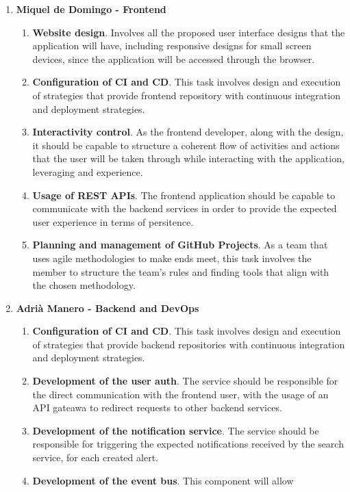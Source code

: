 \documentclass[../memory.tex]{subfiles}
\begin{document}
\begin{enumerate}[label =]
	\item\textbf{Miquel de Domingo - Frontend}
	\begin{enumerate}[label = -]
		\item\textbf{Website design}. Involves all the proposed user interface
		designs that the application will have, including responsive designs
		for small screen devices, since the application will be accessed
		through the browser.
		\item\textbf{Configuration of CI and CD}. This task involves design and
		execution of strategies that provide frontend repository with
		continuous integration and deployment strategies.
		\item\textbf{Interactivity control}. As the frontend developer, along
		with the design, it should be capable to structure a coherent flow of
		activities and actions that the user will be taken through while
		interacting with the application, leveraging and experience.
		\item\textbf{Usage of REST APIs}. The frontend application should be
		capable to communicate with the backend services in order to provide
		the expected user experience in terms of persitence.
		\item\textbf{Planning and management of GitHub Projects}. As a team that
		uses agile methodologies to make ends meet, this task involves the
		member to structure the team's rules and finding tools that align with
		the chosen methodology.
	\end{enumerate}
	\item\textbf{Adrià Manero - Backend and DevOps}
	\begin{enumerate}[label = -]
		\item\textbf{Configuration of CI and CD}. This task involves design and
		execution of strategies that provide backend repositories with
		continuous integration and deployment strategies.
		\item\textbf{Development of the user auth}. The service should be
		responsible for the direct communication with the frontend user, with
		the usage of an API gateawa to redirect requests to other backend
		services.
		\item\textbf{Development of the notification service}. The service should
		be responsible for triggering the expected notifications received by
		the search service, for each created alert.
		\item\textbf{Development of the event bus}. This component will allow

\end{enumerate}
\end{enumerate}
\end{document}
